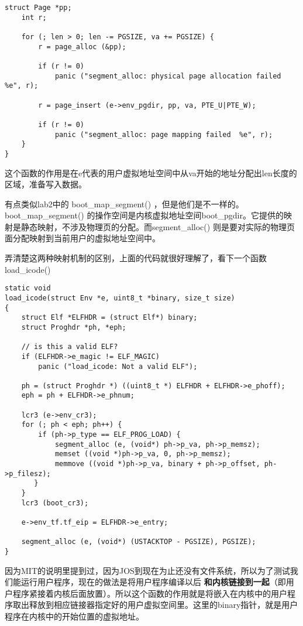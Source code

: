 \documentclass{article}
\newcommand{\highlight}[1]{{\bfseries \color{red}  #1}}
\newcommand{\funcname}[1]{{\ttfamily \small #1}}
\begin{document}
\begin{CJK*}{UTF8}{gkai}
\begin{lstlisting}[style=ccode, title={\scriptsize \ttfamily \bfseries kern/env.c: segment\_alloc ()}]
    struct Page *pp;
    int r;

    for (; len > 0; len -= PGSIZE, va += PGSIZE) {
        r = page_alloc (&pp);

        if (r != 0)
            panic ("segment_alloc: physical page allocation failed  %e", r);

        r = page_insert (e->env_pgdir, pp, va, PTE_U|PTE_W);

        if (r != 0)
            panic ("segment_alloc: page mapping failed  %e", r);
    } 
}
\end{lstlisting}

这个函数的作用是在e代表的用户虚拟地址空间中从va开始的地址分配出len长度的区域，准备写入数据。

有点类似lab2中的 \funcname{boot\_map\_segment()} ，但是他们是不一样的。 \funcname{boot\_map\_segment()} 的操作空间是内核虚拟地址空间boot\_pgdir。它提供的映射是静态映射，不涉及物理页的分配。而\funcname{segment\_alloc()} 则是要对实际的物理页面分配映射到当前用户的虚拟地址空间中。

弄清楚这两种映射机制的区别，上面的代码就很好理解了，看下一个函数\funcname{load\_icode()}


\begin{lstlisting}[style=ccode, title={\scriptsize \ttfamily \bfseries kern/env.c: load\_icode ()}]
static void
load_icode(struct Env *e, uint8_t *binary, size_t size)
{
    struct Elf *ELFHDR = (struct Elf*) binary;
    struct Proghdr *ph, *eph;

    // is this a valid ELF?
    if (ELFHDR->e_magic != ELF_MAGIC)
        panic ("load_icode: Not a valid ELF");

    ph = (struct Proghdr *) ((uint8_t *) ELFHDR + ELFHDR->e_phoff);
    eph = ph + ELFHDR->e_phnum;

    lcr3 (e->env_cr3);
    for (; ph < eph; ph++) {
        if (ph->p_type == ELF_PROG_LOAD) {
            segment_alloc (e, (void*) ph->p_va, ph->p_memsz);
            memset ((void *)ph->p_va, 0, ph->p_memsz);
            memmove ((void *)ph->p_va, binary + ph->p_offset, ph->p_filesz);
       }
    }
    lcr3 (boot_cr3);
    
    e->env_tf.tf_eip = ELFHDR->e_entry;

    segment_alloc (e, (void*) (USTACKTOP - PGSIZE), PGSIZE);
}
\end{lstlisting}

因为MIT的说明里提到过，因为JOS到现在为止还没有文件系统，所以为了测试我们能运行用户程序，现在的做法是将用户程序编译以后\highlight{和内核链接到一起}（即用户程序紧接着内核后面放置）。所以这个函数的作用就是将嵌入在内核中的用户程序取出释放到相应链接器指定好的用户虚拟空间里。这里的binary指针，就是用户程序在内核中的开始位置的虚拟地址。


\end{CJK*}
\end{document}
